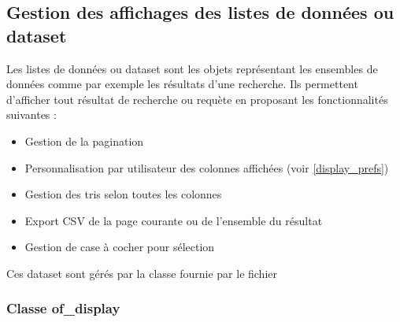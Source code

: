 
\subsection{Gestion des affichages des listes de données ou dataset}

Les listes de données ou dataset sont les objets représentant les ensembles de données comme par exemple les résultats d'une recherche.
Ils permettent d'afficher tout résultat de recherche ou requète en proposant les fonctionnalités suivantes :\\

\begin{itemize}
\item Gestion de la pagination
\item Personnalisation par utilisateur des colonnes affichées (voir \ref{display_prefs})
\item Gestion des tris selon toutes les colonnes
\item Export CSV de la page courante ou de l'ensemble du résultat
\item Gestion de case à cocher pour sélection
\end{itemize}
\vspace{0.3cm}
Ces dataset sont gérés par la classe  fournie par le fichier 


\subsubsection{Classe of\_display}

